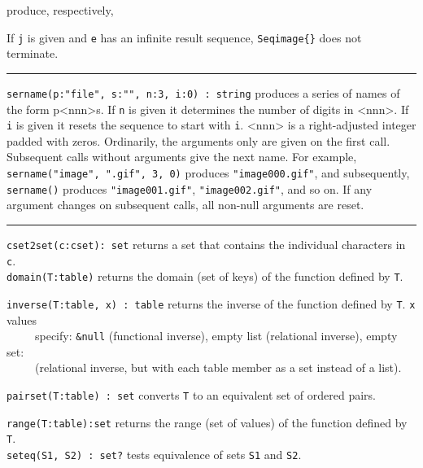 \noindent produce, respectively, 


\noindent If \texttt{j} is given and \texttt{e} has an infinite result
sequence, \texttt{Seqimage\{\}} does not terminate.

\vspace{0.25cm}\hrule{}

\texttt{sername(p:"file",
s:"", n:3, i:0) : string} produces a series
of names of the form p{\textless}nnn{\textgreater}s. If \texttt{n} is
given it determines the number of digits in
{\textless}nnn{\textgreater}. If \texttt{i} is given it resets the
sequence to start with \texttt{i}. {\textless}nnn{\textgreater} is a
right-adjusted integer padded with zeros. Ordinarily, the arguments
only are given on the first call. Subsequent calls without arguments
give the next name. For example,
\texttt{sername("image",
".gif", 3, 0)} produces
\texttt{"image000.gif"}, and subsequently,
\texttt{sername()} produces
\texttt{"image001.gif"},
\texttt{"image002.gif"}, and so on. If any
argument changes on subsequent calls, all non-null arguments are reset.


\vspace{0.25cm}\hrule{}

\texttt{cset2set(c:cset): set} returns a set that contains the
individual characters in \texttt{c}.\\
\texttt{domain(T:table)} returns the domain (set of keys) of the
function defined by \texttt{T}.

\texttt{inverse(T:table, x) : table} returns the inverse of the function
defined by \texttt{T}. \texttt{x} values\\
 \ \ \ \ \ specify: \texttt{\&null} (functional inverse), empty list
 (relational inverse), empty set:\\
 \ \ \ \ \ (relational inverse, but with each table member as a set instead of a list).

\texttt{pairset(T:table) : set} converts \texttt{T} to an equivalent set
of ordered pairs.

\texttt{range(T:table):set} returns the range (set of values) of the
function defined by \texttt{T}.\\
\texttt{seteq(S1, S2) : set?} tests equivalence
of sets \texttt{S1} and \texttt{S2}.

